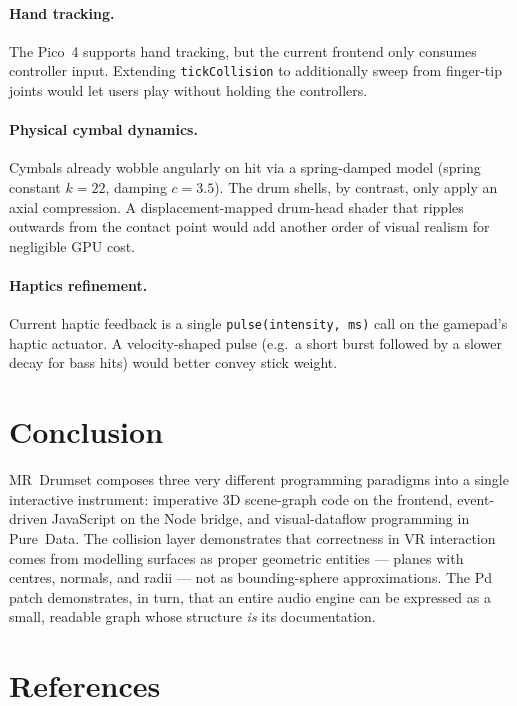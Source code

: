 \documentclass[11pt,a4paper]{article}
\begin{document}
\paragraph{Hand tracking.}
The Pico~4 supports hand tracking, but the current frontend only
consumes controller input. Extending \texttt{tickCollision} to
additionally sweep from finger-tip joints would let users play
without holding the controllers.

\paragraph{Physical cymbal dynamics.}
Cymbals already wobble angularly on hit via a spring-damped model
(spring constant $k=22$, damping $c=3.5$). The drum shells, by
contrast, only apply an axial compression. A displacement-mapped
drum-head shader that ripples outwards from the contact point would
add another order of visual realism for negligible GPU cost.

\paragraph{Haptics refinement.}
Current haptic feedback is a single \texttt{pulse(intensity, ms)}
call on the gamepad's haptic actuator. A velocity-shaped pulse
(e.g.\ a short burst followed by a slower decay for bass hits) would
better convey stick weight.

\section{Conclusion}

MR~Drumset composes three very different programming paradigms into
a single interactive instrument: imperative 3D scene-graph code on
the frontend, event-driven JavaScript on the Node bridge, and
visual-dataflow programming in Pure~Data. The collision layer
demonstrates that correctness in VR interaction comes from modelling
surfaces as proper geometric entities --- planes with centres,
normals, and radii --- not as bounding-sphere approximations. The Pd
patch demonstrates, in turn, that an entire audio engine can be
expressed as a small, readable graph whose structure \emph{is} its
documentation.

\section*{References}
\end{document}
